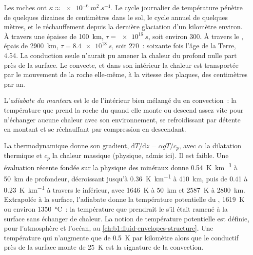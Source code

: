Les roches ont $\kappa \approx \qty{e-6}{m^2.s^{-1}}$. Le cycle journalier de
température pénètre de quelques dizaines de centimètres dans le sol, le cycle
annuel de quelques mètres, et le réchauffement depuis la dernière glaciation d'un
kilomètre environ. À travers une  épaisse de \qty{100}{km},
$\tau = \qty{e16}{s}$, soit environ \qty{300}{\Ma}. À travers le , épais de
\qty{2900}{km}, $\tau = \qty{8.4e18}{s}$, soit \qty{270}{\Ga}~: soixante fois
l'âge de la Terre, \qty{4.54}{\Ga}. %
La conduction seule n'aurait pu amener la chaleur du  profond nulle part
près de la surface. Le  convecte, et dans son intérieur la chaleur est
transportée par le mouvement de la roche elle-même, à la vitesse des plaques, des
centimètres par an. %

\begin{definition}\label{def:b1:heat-budget:adiabat}
L'\emph{adiabate du manteau} est le  de
l'intérieur bien mélangé du  en convection~: la température que prend la
roche du  quand elle monte ou descend assez vite pour n'échanger aucune
chaleur avec son environnement, se refroidissant par détente en montant et se
réchauffant par compression en descendant.
\end{definition}

La thermodynamique donne son gradient, $\mathrm dT/\mathrm dz = \alpha g T/c_p$,
avec $\alpha$ la dilatation thermique et $c_p$ la chaleur massique (physique,
admis ici). Il est faible. Une évaluation récente fondée sur la physique des
minéraux donne \qty{0.54}{K.km^{-1}} à \qty{50}{km} de profondeur, décroissant
jusqu'à \qty{0.36}{K.km^{-1}} à \qty{410}{km}, puis de 0.41 à
\qty{0.23}{K.km^{-1}} à travers le  inférieur, avec \qty{1646}{K} à
\qty{50}{km} et \qty{2587}{K} à \qty{2800}{km}.
Extrapolée à la surface, l'adiabate donne la température potentielle du ,
\qty{1619}{K} ou environ \qty{1350}{\degreeCelsius}~: la température que
prendrait le  s'il était ramené à la surface sans échanger de chaleur. La
notion de température potentielle est définie, pour l'atmosphère et l'océan, au
\cref{ch:b1:fluid-envelopes-structure}. Une température qui n'augmente que de
\qty{0.5}{K} par kilomètre alors que le  conductif près de la surface
monte de \qty{25}{K} est la signature de la convection.

